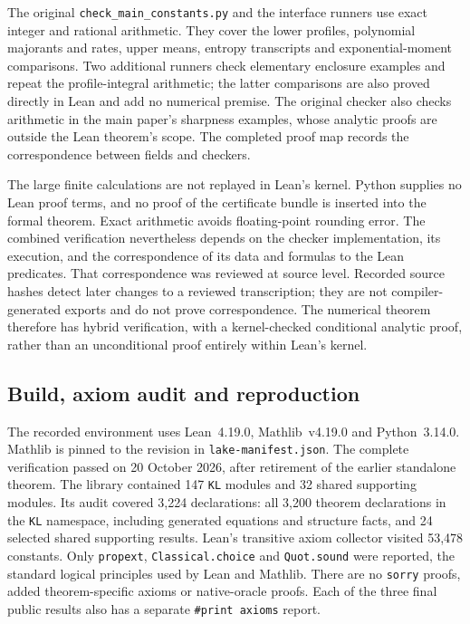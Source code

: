 \documentclass[11pt,a4paper]{article}
\numberwithin{equation}{section}
\begin{document}
The original \texttt{check\_main\_constants.py} and the interface runners use
exact integer and rational arithmetic. They cover the lower profiles,
polynomial majorants and rates, upper means, entropy transcripts and
exponential-moment comparisons. Two additional runners check elementary
enclosure examples and repeat the profile-integral arithmetic; the latter
comparisons are also proved directly in Lean and add no numerical premise.
The original checker also checks arithmetic in the main paper's sharpness
examples, whose analytic proofs are outside the Lean theorem's scope.
The completed proof map records the correspondence between fields and checkers.

The large finite calculations are not replayed in Lean's kernel. Python
supplies no Lean proof terms, and no proof of the certificate bundle is
inserted into the formal theorem. Exact arithmetic avoids floating-point
rounding error. The combined verification nevertheless depends on the
checker implementation, its execution, and the correspondence of its data
and formulas to the Lean predicates. That correspondence was reviewed at
source level. Recorded source hashes detect later changes to a reviewed
transcription; they are not compiler-generated exports and do not prove
correspondence. The numerical theorem therefore has hybrid verification,
with a kernel-checked conditional analytic proof, rather than an
unconditional proof entirely within Lean's kernel.

\subsection{Build, axiom audit and reproduction}
\label{app:lean-audit}

The recorded environment uses Lean~4.19.0, Mathlib~v4.19.0 and Python~3.14.0.
Mathlib is pinned to the revision in \texttt{lake-manifest.json}. The complete
verification passed on 20 October 2026, after retirement of the earlier
standalone theorem. The library contained 147 \texttt{KL} modules and
32 shared supporting modules. Its audit covered 3,224 declarations:
all 3,200 theorem declarations in the \texttt{KL} namespace, including
generated equations and structure facts, and 24 selected shared supporting
results. Lean's transitive axiom collector visited 53,478 constants.
Only \texttt{propext}, \texttt{Classical.choice} and \texttt{Quot.sound}
were reported, the standard logical principles used by Lean and Mathlib.
There are no \texttt{sorry} proofs, added theorem-specific axioms or
native-oracle proofs. Each of the three final public results also has a
separate \texttt{\#print axioms} report.
\end{document}
